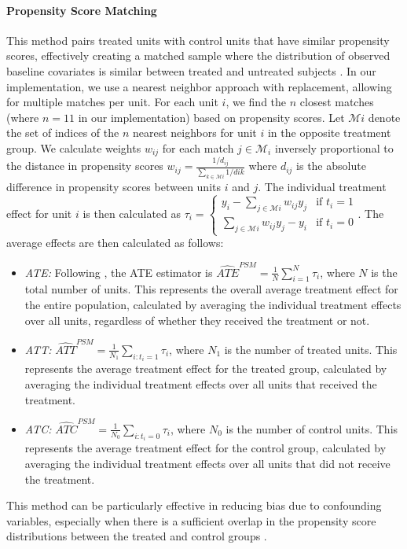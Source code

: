 \documentclass{article}
\begin{document}
\paragraph{Propensity Score Matching} This method pairs treated units with control units that have similar propensity scores, effectively creating a matched sample where the distribution of observed baseline covariates is similar between treated and untreated subjects \citep{austin2011introduction}. In our implementation, we use a nearest neighbor approach with replacement, allowing for multiple matches per unit. For each unit $i$, we find the $n$ closest matches (where $n = 11$ in our implementation) based on propensity scores. Let $\mathcal{M}i$ denote the set of indices of the $n$ nearest neighbors for unit $i$ in the opposite treatment group. We calculate weights $w_{ij}$ for each match $j \in \mathcal{M}_i$ inversely proportional to the distance in propensity scores 
$w_{ij} = \frac{1/d_{ij}}{\sum_{k \in \mathcal{M}i} 1/d{ik}}$
where $d_{ij}$ is the absolute difference in propensity scores between units $i$ and $j$. The individual treatment effect for unit $i$ is then calculated as
$\tau_i = \begin{cases}
y_i - \sum_{j \in \mathcal{M}i} w_{ij}y_j & \text{if } t_i = 1 \\
\sum_{j \in \mathcal{M}i} w_{ij}y_j - y_i & \text{if } t_i = 0
\end{cases}
$.
The average effects are then calculated as follows:
\begin{itemize}
\item \textit{ATE:} Following \citet{basu2023understanding}, the ATE estimator is $\widehat{ATE}^{PSM} = \frac{1}{N} \sum_{i=1}^N \tau_i$, where $N$ is the total number of units. This represents the overall average treatment effect for the entire population, calculated by averaging the individual treatment effects over all units, regardless of whether they received the treatment or not.

\item \textit{ATT:} $\widehat{ATT}^{PSM} = \frac{1}{N_1} \sum_{i:t_i=1} \tau_i$, where $N_1$ is the number of treated units. This represents the average treatment effect for the treated group, calculated by averaging the individual treatment effects over all units that received the treatment.

\item \textit{ATC:} $\widehat{ATC}^{PSM} = \frac{1}{N_0} \sum_{i:t_i=0} \tau_i$, where $N_0$ is the number of control units. This represents the average treatment effect for the control group, calculated by averaging the individual treatment effects over all units that did not receive the treatment.

\end{itemize}
This method can be particularly effective in reducing bias due to confounding variables, especially when there is a sufficient overlap in the propensity score distributions between the treated and control groups \citep{rosenbaum1983central}.
\end{document}
